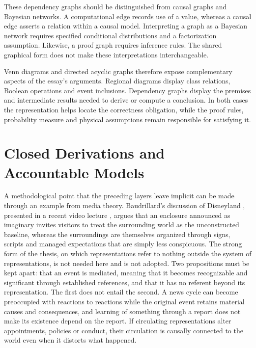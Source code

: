 \documentclass[11pt]{article}
\theoremstyle{definition}
\theoremstyle{remark}
\begin{document}
These dependency graphs should be distinguished from causal graphs
and Bayesian networks. A computational edge records use of a value,
whereas a causal edge asserts a relation within a causal model.
Interpreting a graph as a Bayesian network requires specified
conditional distributions and a factorization assumption.
Likewise, a proof graph requires inference rules. The shared
graphical form does not make these interpretations interchangeable.

Venn diagrams and directed acyclic graphs therefore expose
complementary aspects of the essay's arguments. Regional diagrams
display class relations, Boolean operations and event inclusions.
Dependency graphs display the premises and intermediate results
needed to derive or compute a conclusion. In both cases the
representation helps locate the correctness obligation, while the
proof rules, probability measure and physical assumptions remain
responsible for satisfying it.

\section{Closed Derivations and Accountable Models}\label{sec:accountable}

A methodological point that the preceding layers leave implicit can be made through an example from media theory. Baudrillard's discussion of Disneyland \cite{baudrillard1994}, presented in a recent video lecture \cite{academicagent2026}, argues that an enclosure announced as imaginary invites visitors to treat the surrounding world as the unconstructed baseline, whereas the surroundings are themselves organized through signs, scripts and managed expectations that are simply less conspicuous. The strong form of the thesis, on which representations refer to nothing outside the system of representations, is not needed here and is not adopted. Two propositions must be kept apart: that an event is mediated, meaning that it becomes recognizable and significant through established references, and that it has no referent beyond its representation. The first does not entail the second. A news cycle can become preoccupied with reactions to reactions while the original event retains material causes and consequences, and learning of something through a report does not make its existence depend on the report. If circulating representations alter appointments, policies or conduct, their circulation is causally connected to the world even when it distorts what happened.
\end{document}
